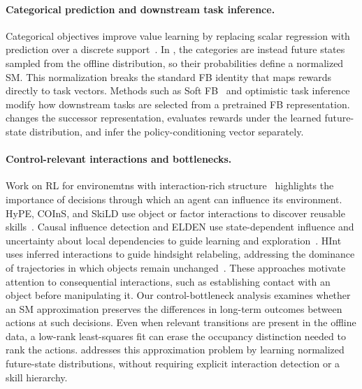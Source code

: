 \paragraph{Categorical prediction and downstream task inference.}
Categorical objectives improve value learning by replacing scalar regression with prediction over a discrete support~\citep{bellemare-icml17a,farebrother-icml24a}.
In \name{}, the categories are instead future states sampled from the offline distribution, so their probabilities define a normalized SM.
This normalization breaks the standard FB identity that maps rewards directly to task vectors.
Methods such as Soft FB~\citep{bagatella-arxiv26a} and optimistic task inference~\citep{rupf-iclr26a} modify how downstream tasks are selected from a pretrained FB representation.
\name{} changes the successor representation, evaluates rewards under the learned future-state distribution, and infer the policy-conditioning vector separately.

\paragraph{Control-relevant interactions and bottlenecks.}
Work on RL for environemtns with interaction-rich structure~\citep{mohan-jair24a} highlights the importance of decisions through which an agent can influence its environment.
HyPE, COInS, and SkiLD use object or factor interactions to discover reusable skills~\citep{chuck2020hypothesis,chuck2024granger,wang2024skild}.
Causal influence detection and ELDEN use state-dependent influence and uncertainty about local dependencies to guide learning and exploration~\citep{seitzer2021causal,wang2023elden}.
HInt uses inferred interactions to guide hindsight relabeling, addressing the dominance of trajectories in which objects remain unchanged~\citep{chuck2025null}.
These approaches motivate attention to consequential interactions, such as establishing contact with an object before manipulating it.
Our control-bottleneck analysis examines whether an SM approximation preserves the differences in long-term outcomes between actions at such decisions.
Even when relevant transitions are present in the offline data, a low-rank least-squares fit can erase the occupancy distinction needed to rank the actions.
\name{} addresses this approximation problem by learning normalized future-state distributions, without requiring explicit interaction detection or a skill hierarchy.